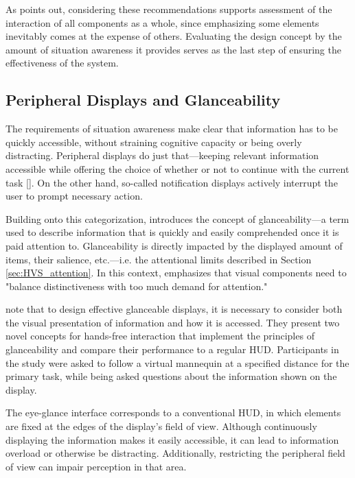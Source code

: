 As \textcite{endsleyTheorySituationAwareness1995} points out, considering these recommendations supports assessment of the interaction of all components as a whole, since emphasizing some elements inevitably comes at the expense of others. Evaluating the design concept by the amount of situation awareness it provides serves as the last step of ensuring the effectiveness of the system.

\subsection{Peripheral Displays and Glanceability}

The requirements of situation awareness make clear that information has to be quickly accessible, without straining cognitive capacity or being overly distracting.
Peripheral displays do just that—keeping relevant information accessible while offering the choice of whether or not to continue with the current task [\cite{matthewsDefiningDesigningEvaluating2005}].
On the other hand, so-called notification displays actively interrupt the user to prompt necessary action. 

Building onto this categorization, \textcite{matthewsDesigningGlanceablePeripheral2006} introduces the concept of glanceability—a term used to describe information that is quickly and easily comprehended once it is paid attention to.
Glanceability is directly impacted by the displayed amount of items, their salience, etc.—i.e. the attentional limits described in Section \ref{sec:HVS_attention}. In this context, \textcite{matthewsDesigningGlanceablePeripheral2006} emphasizes that visual components need to "balance distinctiveness with too much demand for attention."

\textcite{luGlanceableAREvaluating2020} note that to design effective glanceable displays, it is necessary to consider both the visual presentation of information and how it is accessed. They present two novel concepts for hands-free interaction that implement the principles of glanceability and compare their performance to a regular HUD. Participants in the study were asked to follow a virtual mannequin at a specified distance for the primary task, while being asked questions about the information shown on the display.

The eye-glance interface corresponds to a conventional HUD, in which elements are fixed at the edges of the display's field of view. Although continuously displaying the information makes it easily accessible, it can lead to information overload or otherwise be distracting. Additionally, restricting the peripheral field of view can impair perception in that area.


